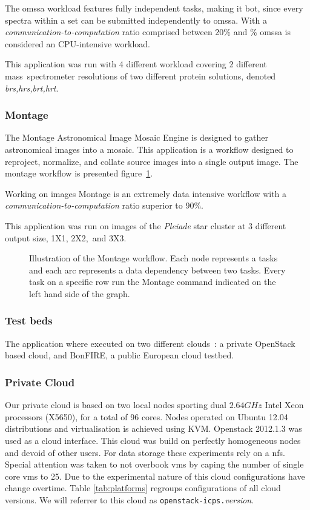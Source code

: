 \documentclass[a4paper,10pt]{article}
\begin{document}
The \ac{omssa} workload features fully independent tasks, making it \ac{bot},
since every spectra within a set can be submitted independently to \ac{omssa}.
With a \emph{communication-to-computation} ratio comprised between 20\% and \%
\ac{omssa} is considered an CPU-intensive workload.

This application was run with 4 different workload covering 2 different
mass~spectrometer resolutions of two different protein solutions, denoted
\emph{brs,hrs,brt,hrt}.

\subsubsection{Montage}

The Montage Astronomical Image Mosaic Engine\cite{montage2009} is designed to
gather astronomical images into a mosaic. This application is a workflow
designed to reproject, normalize, and collate source images into a single output
image. The montage workflow is presented figure~\ref{fig:montagewf}.

Working on images Montage is an extremely data intensive workflow with a
\emph{communication-to-computation} ratio superior to 90\%.

This application was run on images of the \emph{Pleiade} star cluster at 3
different output size, 1X1, 2X2,~and 3X3.

\begin{figure}[ht]
	
	\caption{Illustration of the Montage workflow. Each node represents a
	tasks and each arc represents a data dependency between two tasks. Every
	task on a specific row run the Montage command indicated on the left
	hand side of the graph.}
	\label{fig:montagewf}
\end{figure}

\subsubsection{Test beds}

The application where executed on two different clouds~: a private OpenStack
based cloud, and BonFIRE\cite{Kavoussanakis2013}, a public European cloud
testbed.

\subsubsection{Private Cloud}

Our private cloud is based on two local nodes sporting dual $2.64GHz$ Intel Xeon
processors (X5650), for a total of 96 cores. Nodes operated on Ubuntu 12.04
distributions and virtualisation is achieved using KVM. Openstack 2012.1.3 was
used as a cloud interface. This cloud was build on perfectly homogeneous nodes
and devoid of other users. For data storage these experiments rely on a
\ac{nfs}. Special attention was taken to not overbook \acp{vm} by caping the
number of single core \acp{vm} to 25. Due to the experimental nature of this
cloud configurations have change overtime. Table \ref{tab:platforms} regroups
configurations of all cloud versions. We will referrer to this cloud as
\texttt{openstack-icps.}\emph{version}.
\end{document}

